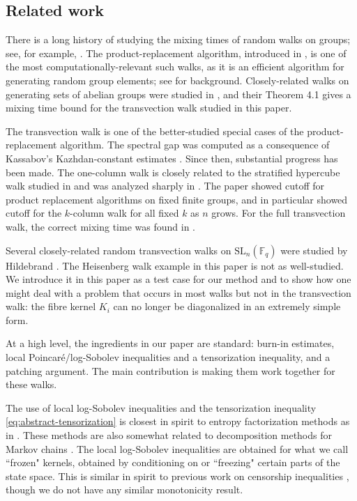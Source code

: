 \documentclass[11pt, reqno]{amsart}
\numberwithin{equation}{section}
\begin{document}
\subsection{Related work}\label{subsec:related-work}

There is a long history of studying the mixing times of random walks on groups; see, for example, \cite{Diaconis1988,SaloffCoste2004,levin2017markov}. The product-replacement algorithm, introduced in
\cite{CellerLeedhamGreenMurrayNiemeyerOBrien1995}, is one of the most computationally-relevant such walks, as it is an efficient algorithm for generating random group elements; see \cite{Pak2001} for
background. Closely-related walks on generating sets of abelian groups were studied in
\cite{Diaconis1996WalksOG}, and their Theorem 4.1 gives a mixing time bound for the transvection walk studied in this paper.  

The transvection walk is one of the better-studied special cases of the product-replacement algorithm. The spectral gap was computed as a consequence of Kassabov's Kazhdan-constant estimates \cite{Kassabov2005}. Since then, substantial progress has been made. The one-column walk is closely related to the stratified hypercube walk studied in \cite{ChungGraham1997} and was analyzed sharply in \cite{BenHamouPeres2018}. The paper \cite{PeresTanakaZhai2020} showed cutoff for product replacement algorithms on fixed finite groups, and in particular showed cutoff for the $k$-column walk for all fixed $k$ as $n$ grows. For the full transvection walk, the correct mixing time was found in \cite[Theorem~1]{BenHamou2025}.  

Several closely-related random transvection walks on \(\mathrm{SL}_n(\mathbb F_q)\) were studied by Hildebrand \cite{Hildebrand1992}. The Heisenberg walk example in this paper is not as well-studied. We introduce it in this paper as a test case for our method and to show how one might deal with a problem that occurs in most walks but not in the transvection walk: the fibre kernel $K_i$ can no longer be diagonalized in an extremely simple form. 


At a high level, the ingredients in our paper are  standard:
burn-in estimates, local Poincar\'e/log-Sobolev inequalities and a tensorization inequality, and a patching argument.  The main contribution is making them work together for these walks.  

The use of local log-Sobolev inequalities and the tensorization inequality \eqref{eq:abstract-tensorization} is closest in spirit to entropy
factorization methods as in 
\cite{Cesi2001QuasiFactorization,LuYau1993KawasakiGlauber,
CaputoMenzTetali2015ApproxTensor,CaputoParisi2021BlockFactorization,
BlancaCaputoChenParisiStefankovicVigoda2022Mixing}.  These methods are also somewhat related to decomposition methods for Markov chains
\cite{MadrasRandall2002Decomposition,JerrumSonTetaliVigoda2004Decomposable}. The local log-Sobolev inequalities are obtained for what we call ``frozen" kernels, obtained by conditioning on or ``freezing" certain parts of the state space. This is similar in spirit to previous work on censorship inequalities
\cite{PeresWinkler2013Censoring,FillKahn2013Comparison}, though we do not have any similar monotonicity result. 
\end{document}
